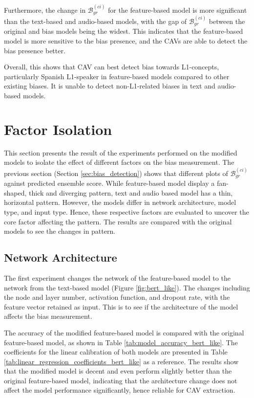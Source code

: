 Furthermore, the change in $\mathcal{B}^{(ci)}_{gr}$ for the feature-based model is more significant than the text-based and audio-based models, with the gap of $\mathcal{B}^{(ci)}_{gr}$ between the original and bias models being the widest. This indicates that the feature-based model is more sensitive to the bias presence, and the CAVs are able to detect the bias presence better.

Overall, this shows that CAV can best detect bias towards L1-concepts, particularly Spanish L1-speaker in feature-based models compared to other existing biases. It is unable to detect non-L1-related biases in text and audio-based models.

\section{Factor Isolation} \label{sec:factor_isolation}
This section presents the result of the experiments performed on the modified models to isolate the effect of different factors on the bias measurement. The previous section (Section \ref{sec:bias_detection}) shows that different plots of $\mathcal{B}^{(ci)}_{gr}$ against predicted ensemble score. While feature-based model display a fan-shaped, thick and diverging pattern, text and audio based model has a thin, horizontal pattern. However, the models differ in network architecture, model type, and input type. Hence, these respective factors are evaluated to uncover the core factor affecting the pattern. The results are compared with the original models to see the changes in pattern.

\subsection{Network Architecture}
The first experiment changes the network of the feature-based model to the network from the text-based model (Figure \ref{fig:bert_like}). The changes including the node and layer number, activation function, and dropout rate, with the feature vector retained as input. This is to see if the architecture of the model affects the bias measurement.

The accuracy of the modified feature-based model is compared with the original feature-based model, as shown in Table \ref{tab:model_accuracy_bert_like}. The coefficients for the linear calibration of both models are presented in Table \ref{tab:linear_regression_coefficients_bert_like} as a reference. The results show that the modified model is decent and even perform slightly better than the original feature-based model, indicating that the architecture change does not affect the model performance significantly, hence reliable for CAV extraction.

